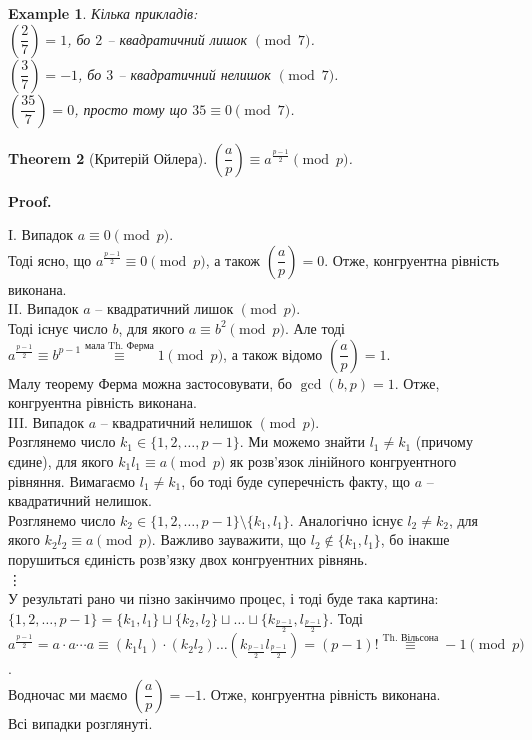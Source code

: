 \documentclass[a4paper, 14pt]{extarticle}
\makeatletter
\theoremstyle{theoremdd}
\newtheorem{theorem}{Theorem}[subsection]
\theoremstyle{theoremdd}
\theoremstyle{theoremdd}
\theoremstyle{theoremdd}
\newtheorem{example}[theorem]{Example}
\theoremstyle{theoremdd}
\theoremstyle{theoremdd}
\theoremstyle{theoremdd}
\theoremstyle{theoremdd}
\def\qed{$\blacksquare$}
\renewenvironment{proof}[1][Proof.\\]{\par
\pushQED{\hfill \qed}%
\normalfont \topsep6\p@\@plus6\p@\relax
\trivlist
\item\relax
{\bfseries
#1\@addpunct{.}}\hspace\labelsep\ignorespaces
}{%
\popQED\endtrivlist\@endpefalse
}
\makeatother
\begin{document}
\begin{example} 
Кілька прикладів:\\
$\left( \dfrac{2}{7} \right) = 1$, бо $2$ -- квадратичний лишок $\pmod 7$.\\
$\left( \dfrac{3}{7} \right) = -1$, бо $3$ -- квадратичний нелишок $\pmod 7$.\\
$\left( \dfrac{35}{7} \right) = 0$, просто тому що $35 \equiv 0 \pmod 7$.
\end{example}

\begin{theorem}[Критерій Ойлера]
$\left( \dfrac{a}{p} \right) \equiv a^{\textstyle\frac{p-1}{2}} \pmod p$.
\end{theorem}

\begin{proof}
I. Випадок $a \equiv 0 \pmod p$.\\
Тоді ясно, що $a^{\frac{p-1}{2}} \equiv 0 \pmod p$, а також $\left( \dfrac{a}{p} \right) = 0$. Отже, конгруентна рівність виконана.
\bigskip \\
II. Випадок $a$ -- квадратичний лишок $\pmod p$.\\
Тоді існує число $b$, для якого $a \equiv b^2 \pmod p$. Але тоді \\ $a^{\frac{p-1}{2}} \equiv b^{p-1} \overset{\text{мала Th. Ферма}}{\equiv} 1 \pmod p$, а також відомо $\left( \dfrac{a}{p} \right) = 1$. \\
Малу теорему Ферма можна застосовувати, бо $\gcd(b,p) = 1$. Отже, конгруентна рівність виконана.
\bigskip \\
III. Випадок $a$ -- квадратичний нелишок $\pmod p$.\\
Розглянемо число $k_1 \in \{1,2,\dots,p-1\}$. Ми можемо знайти $l_1 \neq k_1$ (причому єдине), для якого $k_1 l_1 \equiv a \pmod p$ як розв'язок лінійного конгруентного рівняння. Вимагаємо $l_1 \neq k_1$, бо тоді буде суперечність факту, що $a$ -- квадратичний нелишок.\\
Розглянемо число $k_2 \in \{1,2,\dots,p-1\} \setminus \{k_1,l_1\}$. Аналогічно існує $l_2 \neq k_2$, для якого $k_2 l_2 \equiv a \pmod p$. Важливо зауважити, що $l_2 \not\in \{k_1,l_1\}$, бо інакше порушиться єдиність розв'язку двох конгруентних рівнянь.\\
\vdots \\
У результаті рано чи пізно закінчимо процес, і тоді буде така картина:\\
$\{1,2,\dots,p-1\} = \{k_1,l_1\} \sqcup \{k_2,l_2\} \sqcup \dots \sqcup \{k_{\frac{p-1}{2}},l_{\frac{p-1}{2}}\}$. Тоді\\
$a^{\frac{p-1}{2}} = a \cdot a \cdots a \equiv (k_1 l_1) \cdot (k_2 l_2) \dots (k_{\frac{p-1}{2}} l_{\frac{p-1}{2}}) = (p-1)! \overset{\text{Th. Вільсона}}{\equiv} -1 \pmod p$.\\
Водночас ми маємо $\left( \dfrac{a}{p} \right) = -1$. Отже, конгруентна рівність виконана.\\
Всі випадки розглянуті.
\end{proof}
\end{document}
